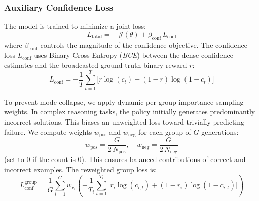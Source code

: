 \documentclass[a4paper,oneside,10pt,ngerman,english]{scrartcl}
\begin{document}
\subsubsection{Auxiliary Confidence Loss}
\label{sec:conf_loss}
The model is trained to minimize a joint loss:
\begin{equation}
	L_{\mathrm{total}} = -\,\mathcal{J}(\theta) + \beta_{\mathrm{conf}}\, L_{\mathrm{conf}}
\end{equation}
where $\beta_{\mathrm{conf}}$ controls the magnitude of the confidence objective. The confidence loss $L_{\mathrm{conf}}$ uses Binary Cross Entropy (\textit{BCE}) between the dense confidence estimates and the broadcasted ground-truth binary reward $r$:
\begin{equation}
	L_{\mathrm{conf}} = -\frac{1}{T} \sum_{t=1}^{T} \bigl[r \log(c_t) + (1{-}r)\log(1{-}c_t)\bigr]
\end{equation}

To prevent mode collapse, we apply dynamic per-group importance sampling weights. In complex reasoning tasks, the policy initially generates predominantly incorrect solutions. This biases an unweighted loss toward trivially predicting failure. We compute weights $w_{\mathrm{pos}}$ and $w_{\mathrm{neg}}$ for each group of $G$ generations:
\begin{equation}
	w_{\mathrm{pos}} = \frac{G}{2\, N_{\mathrm{pos}}}, \quad w_{\mathrm{neg}} = \frac{G}{2\, N_{\mathrm{neg}}}
\end{equation}
(set to $0$ if the count is $0$). This ensures balanced contributions of correct and incorrect examples. The reweighted group loss is:
\begin{equation}
	L_{\mathrm{conf}}^{\mathrm{group}} = \frac{1}{G} \sum_{i=1}^{G} w_{r_i} \left( -\frac{1}{T_i} \sum_{t=1}^{T_i} \bigl[r_i \log(c_{i,t}) + (1{-}r_i)\log(1{-}c_{i,t})\bigr] \right)
\end{equation}
\end{document}
